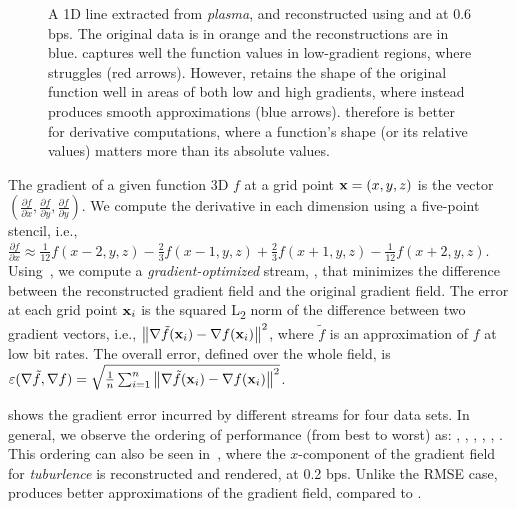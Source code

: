 \begin{figure}[h]
\centering
{}
\caption{A 1D line extracted from \emph{plasma}, and reconstructed using \sbit and \swav at 0.6 bps.
The original data is in orange and the reconstructions are in blue. \swav captures well the function
values in low-gradient regions, where \sbit struggles (red arrows). However, \sbit retains the shape
of the original function well in areas of both low and high gradients, where \swav instead produces
smooth approximations (blue arrows). \sbit therefore is better for derivative computations, where a
function's shape (or its relative values) matters more than its absolute values.}
\label{fig:bit-plane-vs-wavelet-norm-gradient}
\end{figure}

The gradient of a given function 3D $f$ at a grid point \mbox{$\x = (x,y,z)$} is the vector
$(\frac{\partial f}{\partial x},\frac{\partial f}{\partial y}, \frac{\partial f}{\partial y})$. We
compute the derivative in each dimension using a five-point stencil, i.e., \mbox{$\frac{\partial
f}{\partial x} \approx \frac{1}{12}f(x-2,y,z) - \frac{2}{3}f(x-1,y,z) + \frac{2}{3}f(x+1,y,z) -
\frac{1}{12}f(x+2,y,z)$.} 
Using~, we compute a \emph{gradient-optimized} stream, \sgop, that minimizes the
difference between the reconstructed gradient field and the original gradient field. The error at
each grid point $\x_i$ is the squared L\textsubscript{2} norm of the difference between two gradient
vectors, i.e., $\norm{\nabla \tilde{f}(\x_i) - \nabla f(\x_i)}^2$, where $\tilde{f}$ is an
approximation of $f$ at low bit rates. The overall error, defined over the whole field, is
$\err(\nabla \tilde{f}, \nabla f) = \sqrt{\frac{1}{n} \sum_{i=1}^{n}{\norm{\nabla
\tilde{f}(\x_i)-\nabla f(\x_i)}^2}}$.

 shows the gradient error incurred by different streams for four
data sets. In general, we observe the ordering of performance (from best to worst) as: \sgop, \sgsg,
\sbit, \swav, \smag, \slvl. This ordering can also be seen in~,
where the $x$-component of the gradient field for \emph{tuburlence} is reconstructed and rendered,
at 0.2 bps. Unlike the RMSE case, \sbit produces better approximations of the gradient field,
compared to \swav.

